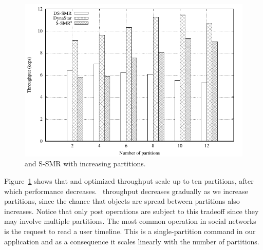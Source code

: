\begin{figure}[ht]
	\includegraphics[width=0.95\columnwidth]{figures/experiments/social-network-ideal-partition/social-network-ideal-partition}
	\caption{\dynastar and S-SMR with increasing partitions.}
	\label{fig:4p1p_varying_partition_size}
\end{figure}

Figure~\ref{fig:4p1p_varying_partition_size} shows that \dynastar and optimized \ssmr throughput scale up to ten partitions, after which performance decreases. \dssmr\ throughput decreases gradually as we increase partitions, since the chance that objects are spread between partitions also increases.
Notice that only post operations are subject to this tradeoff since they may involve multiple partitions.
The most common operation in social networks is the request to read a user timeline. This is a single-partition
command in our application and as a consequence it scales linearly with the number of partitions.



